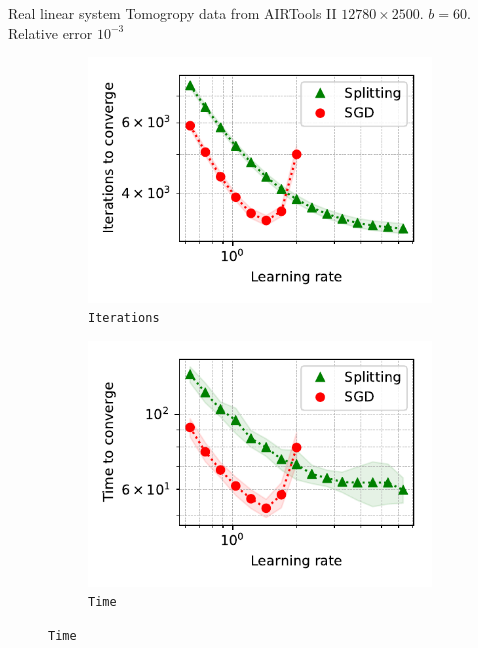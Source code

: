 \documentclass[aspectratio=169]{beamer}
\begin{document}
\begin{frame}{Real linear system}
Tomogropy data from AIRTools II $12780\times2500$. $b = 60$. Relative error $10^{-3}$
\begin{figure}
    \begin{subfigure}[b]{0.5\textwidth}
            \centering
            \includegraphics[width=\linewidth]{LLS_tom_iter.pdf}
            \vspace{-25pt}
            \caption{{\small \texttt{Iterations}}}
            \vspace{-22pt}
    \end{subfigure}%
    \begin{subfigure}[b]{0.5\textwidth}
            \centering
            \includegraphics[width=\linewidth]{LLS_tom_time.pdf}
            \vspace{-25pt}
            \caption{{\small \texttt{Time}}}
            \vspace{-22pt}
    \end{subfigure}%
\end{figure}
\end{frame}
\end{document}
